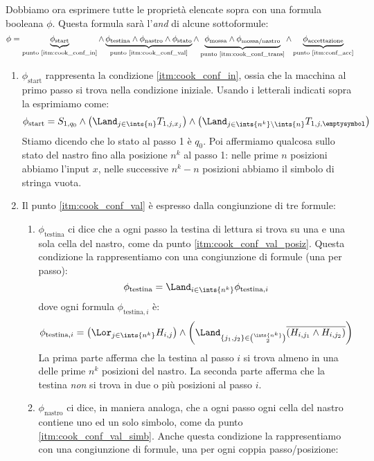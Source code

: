Dobbiamo ora esprimere tutte le propriet\`a elencate sopra con una formula booleana $\phi$.
Questa formula sar\`a l'\emph{and} di alcune sottoformule:
\[
	\phi = 
	\underbrace{\phi_{\text{start}}}_{\text{punto \ref{itm:cook_conf_in}}} \land 
	\underbrace{\phi_{\text{testina}} \land \phi_{\text{nastro}} \land \phi_{\text{stato}}}_{\text{punto \ref{itm:cook_conf_val}}} \land 
	\underbrace{\phi_{\text{mossa}} \land \phi_{\text{mossa/nastro}}}_{\text{punto \ref{itm:cook_conf_trans}}} \land 
	\underbrace{\phi_{\text{accettazione}}}_{\text{punto \ref{itm:conf_acc}}}
\]
\begin{enumerate}
	\item $\phi_{\text{start}}$ rappresenta la condizione \ref{itm:cook_conf_in}, ossia che la macchina al primo passo si trova nella condizione iniziale.
	Usando i letterali indicati sopra la esprimiamo come:
	\[
		\phi_{\text{start}} = 
		S_{1,q_0} \land \left( \Land_{j \in \ints{n}} T_{1,j,x_j} \right) \land \left( \Land_{j \in \ints{n^k} \setminus \ints{n}} T_{1,j,\emptysymbol} \right)
	\]
	Stiamo dicendo che lo stato al passo 1 \`e $q_0$.
	Poi affermiamo qualcosa sullo stato del nastro fino alla posizione $n^k$ al passo 1: nelle prime $n$ posizioni abbiamo l'input $x$, nelle successive $n^k - n$ posizioni abbiamo il simbolo di stringa vuota.
	\item Il punto \ref{itm:cook_conf_val} \`e espresso dalla congiunzione di tre formule:
		\begin{enumerate}
			\item $\phi_{\text{testina}}$ ci dice che a ogni passo la testina di lettura si trova su una e una sola cella del nastro, come da punto \ref{itm:cook_conf_val_posiz}.
			Questa condizione la rappresentiamo con una congiunzione di formule (una per passo):
			\[
				\phi_{\text{testina}} = \Land_{i \in \ints{n^k}} \phi_{\text{testina},i}
			\]
			dove ogni formula $\phi_{\text{testina},i}$ \`e:
			\[
				\phi_{\text{testina},i} = \left( \Lor_{j \in \ints{n^k}} H_{i,j} \right) \land
				\left( \Land_{\{j_1,j_2\} \in \binom{\ints{n^k}}{2}} \overline{\left( H_{i,j_1} \land H_{i,j_2} \right)} \right)
			\]
			La prima parte afferma che la testina al passo $i$ si trova almeno in una delle prime $n^k$ posizioni del nastro.
			La seconda parte afferma che la testina \emph{non} si trova in due o pi\`u posizioni al passo $i$.
			\item $\phi_{\text{nastro}}$ ci dice, in maniera analoga, che a ogni passo ogni cella del nastro contiene uno ed un solo simbolo, come da punto \ref{itm:cook_conf_val_simb}.
			Anche questa condizione la rappresentiamo con una congiunzione di formule, una per ogni coppia passo/posizione:

\end{enumerate}
\end{enumerate}
